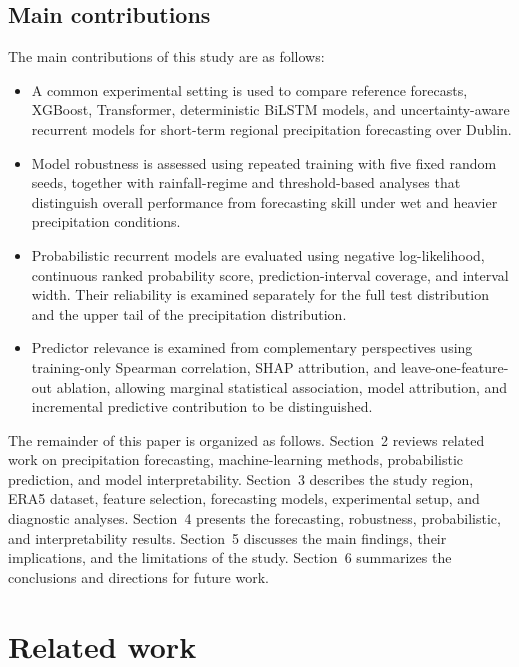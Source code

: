 \documentclass[referee,pdflatex,sn-basic]{sn-jnl}%
\theoremstyle{thmstyleone}%
\theoremstyle{thmstyletwo}%
\theoremstyle{thmstylethree}%
\begin{document}
\subsection{Main contributions}

The main contributions of this study are as follows:

\begin{itemize}
    \item A common experimental setting is used to compare reference forecasts, XGBoost, Transformer, deterministic BiLSTM models, and uncertainty-aware recurrent models for short-term regional precipitation forecasting over Dublin.

    \item Model robustness is assessed using repeated training with five fixed random seeds, together with rainfall-regime and threshold-based analyses that distinguish overall performance from forecasting skill under wet and heavier precipitation conditions.

    \item Probabilistic recurrent models are evaluated using negative log-likelihood, continuous ranked probability score, prediction-interval coverage, and interval width. Their reliability is examined separately for the full test distribution and the upper tail of the precipitation distribution.

    \item Predictor relevance is examined from complementary perspectives using training-only Spearman correlation, SHAP attribution, and leave-one-feature-out ablation, allowing marginal statistical association, model attribution, and incremental predictive contribution to be distinguished.
\end{itemize}

The remainder of this paper is organized as follows. Section~2 reviews related work on precipitation forecasting, machine-learning methods, probabilistic prediction, and model interpretability. Section~3 describes the study region, ERA5 dataset, feature selection, forecasting models, experimental setup, and diagnostic analyses. Section~4 presents the forecasting, robustness, probabilistic, and interpretability results. Section~5 discusses the main findings, their implications, and the limitations of the study. Section~6 summarizes the conclusions and directions for future work.

\section{Related work}
\end{document}
